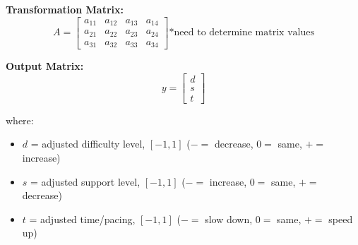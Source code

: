 \documentclass{article}
\begin{document}
        \textbf{Transformation Matrix:}
            \[
                A = \begin{bmatrix} 
                a_{11} & a_{12} & a_{13} & a_{14} \\
                a_{21} & a_{22} & a_{23} & a_{24} \\
                a_{31} & a_{32} & a_{33} & a_{34}
                \end{bmatrix}
                \text{*need to determine matrix values}
            \]

        \textbf{Output Matrix:}
            \[
                y = \begin{bmatrix} d \\ s \\ t \end{bmatrix}
            \]

        where:
            \begin{itemize}
                \item $d$ = adjusted difficulty level, $[-1, 1]$ ($- = $ decrease, $0 = $ same, $+ = $ increase)
                \item $s$ = adjusted support level, $[-1, 1]$ ($- = $ increase, $0 = $ same, $+ = $ decrease)
                \item $t$ = adjusted time/pacing, $[-1, 1]$ ($- = $ slow down, $0 = $ same, $+ = $ speed up)
            \end{itemize}
\end{document}
